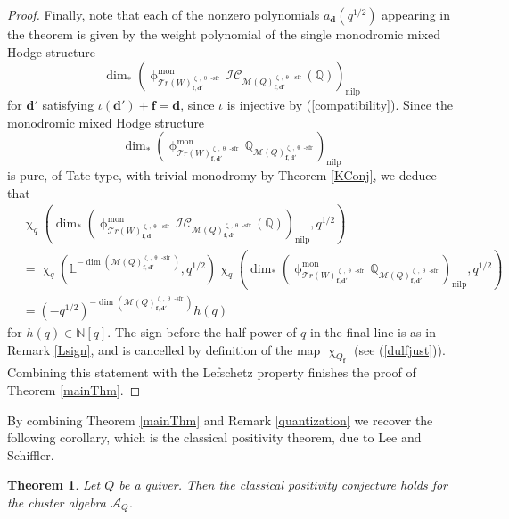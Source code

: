 \documentclass[a4paper,10pt]{amsart}
\newtheorem{theorem}{Theorem}[section]
\newcommand{\dd}{\mathbf{d}}
\newcommand{\ff}{\mathbf{f}}
\newcommand{\LL}{\mathbb{L}}
\newcommand{\QQ}{\mathbb{Q}}
\DeclareMathOperator{\sfr}{-sfr}
\newcommand{\WW}{\mathcal{T}r(W)}
\newcommand{\Msp}{\mathcal{M}}
\newcommand{\ICS}{\mathcal{IC}}
\newcommand{\phim}[1]{\phi^{\mon}_{#1}}
\renewcommand{\theta}{\uptheta}
\renewcommand{\zeta}{\upzeta}
\renewcommand{\chi}{\upchi}
\renewcommand{\phi}{\upphi}
\DeclareMathOperator{\nilp}{nilp}
\DeclareMathOperator{\mon}{mon}
\DeclareMathOperator{\Ss}{\overline{s}}
\begin{document}
\begin{proof}
Finally, note that each of the nonzero polynomials $a_\dd(q^{1/2})$ appearing in the theorem is given by the weight polynomial of the single monodromic mixed Hodge structure 
\begin{equation*}
\label{TF}
\dim_*\left(\phim{\WW_{\ff,\dd'}^{\zeta_{\Ss},\theta_{\Ss}\sfr}}\ICS_{\Msp(Q)_{\ff,\dd'}^{\zeta_{\Ss},\theta_{\Ss}\sfr}}(\QQ)\right)_{\nilp}
\end{equation*}
for $\dd'$ satisfying $\iota(\dd')+\ff=\dd$, since $\iota$ is injective by (\ref{compatibility}).  Since the monodromic mixed Hodge structure
\[
\dim_*\left(\phim{\WW_{\ff,\dd'}^{\zeta_{\Ss},\theta_{\Ss}\sfr}}\QQ_{\Msp(Q)_{\ff,\dd'}^{\zeta_{\Ss},\theta_{\Ss}\sfr}}\right)_{\nilp}
\]
is pure, of Tate type, with trivial monodromy by Theorem \ref{KConj}, we deduce that 
\begin{align*}
&\chi_q\left(\dim_*\left(\phim{\WW_{\ff,\dd'}^{\zeta_{\Ss},\theta_{\Ss}\sfr}}\ICS_{\Msp(Q)_{\ff,\dd'}^{\zeta_{\Ss},\theta_{\Ss}\sfr}}(\QQ)\right)_{\nilp},q^{1/2}\right)\\&=\chi_q\left(\LL^{-\dim(\Msp(Q)_{\ff,\dd'}^{\zeta_{\Ss},\theta_{\Ss}\sfr})},q^{1/2}\right)\chi_q\left(\dim_*\left(\phim{\WW_{\ff,\dd'}^{\zeta_{\Ss},\theta_{\Ss}\sfr}}\mathbb{Q}_{\Msp(Q)_{\ff,\dd'}^{\zeta_{\Ss},\theta_{\Ss}\sfr}}\right)_{\nilp},q^{1/2}\right)\\&=(-q^{1/2})^{-\dim(\Msp(Q)_{\ff,\dd'}^{\zeta_{\Ss},\theta_{\Ss}\sfr})}h(q)
\end{align*}
for $h(q)\in\mathbb{N}[q]$.  The sign before the half power of $q$ in the final line is as in Remark \ref{Lsign}, and is cancelled by definition of the map $\chi_{Q_{\ff}}$ (see (\ref{dulfjust})).  Combining this statement with the Lefschetz property finishes the proof of Theorem \ref{mainThm}.
\end{proof}
\renewcommand*{\proofname}{Proof}
By combining Theorem \ref{mainThm} and Remark \ref{quantization} we recover the following corollary, which is the classical positivity theorem, due to Lee and Schiffler.
\begin{theorem}\cite{LS15}
Let $Q$ be a quiver.  Then the classical positivity conjecture holds for the cluster algebra $\mathcal{A}_Q$.
\end{theorem}

\appendix
\end{document}
